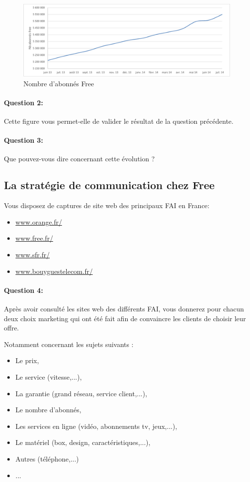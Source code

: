 \begin{figure}[htbp]
\begin{center}
\includegraphics[width=0.8\linewidth]{img/abon_free}
\caption{Nombre d'abonnés Free}
\label{fig:abon_free}
\end{center}
\end{figure}

\paragraph{Question 2:} Cette figure vous permet-elle de valider le résultat de la question précédente.

\paragraph{Question 3:} Que pouvez-vous dire concernant cette évolution ?

\subsection{La stratégie de communication chez Free}

Vous disposez de captures de site web des principaux FAI en France:
\begin{itemize}
 \item \url{www.orange.fr/}
 \item \url{www.free.fr/}
 \item \url{www.sfr.fr/}
 \item \url{www.bouyguestelecom.fr/}
\end{itemize}

\paragraph{Question 4:} Après avoir consulté les sites web des différents FAI, vous donnerez pour chacun deux choix marketing qui ont été fait afin de convaincre les clients de choisir leur offre.

Notamment concernant les sujets suivants :
\begin{itemize}
 \item Le prix,
 \item Le service (vitesse,...),
 \item La garantie (grand réseau, service client,...),
 \item Le nombre d'abonnés,
 \item Les services en ligne (vidéo, abonnements tv, jeux,...),
 \item Le matériel (box, design, caractéristiques,...),
 \item Autres (téléphone,...)
 \item ...
\end{itemize}

